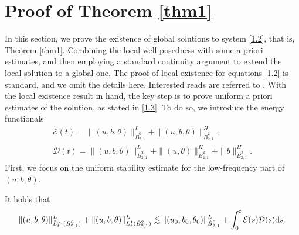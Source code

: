 \documentclass[reqno]{amsart}
\begin{document}
\section{Proof of Theorem \ref{thm1}}

 In this section, we prove the existence of global solutions to system
 \eqref{1.2}, that is, Theorem \ref{thm1}. Combining the local well-posedness with
some a priori estimates, and then employing a standard continuity argument to extend
the local solution to a global one. The proof of local existence for equations
\eqref{1.2} is standard, and we omit the details here. Interested reads are referred
to \cite{MR1855277,MR4496608}. With the local existence result in hand, the key step
is to prove uniform a priori estimates of the solution, as stated in \eqref{1.3}.
To do so, we introduce the energy functionals
 \begin{equation}\label{3.1}
\begin{gathered}
 \mathcal{E}(t)=\|(u,b,\theta)\|^L_{\dot{B}^0_{2,1}}
 +\|(u,b,\theta)\|^H_{\dot{B}^2_{2,1}}, \\
 \mathcal{D}(t)=\|(u,b,\theta)\|^L_{\dot{B}^2_{2,1}}+\|(u,\theta)\|^H_{\dot{B}^2_{2,1}}
 +\|b\|^H_{\dot{B}^3_{2,1}}.
\end{gathered}
\end{equation}
First, we focus on the uniform stability estimate for the low-frequency part of
$(u,b,\theta)$.

\begin{lemma}\label{lem3.1}
It holds that
\begin{equation}\label{3.2}
 \|(u,b,\theta)\|_{\tilde{L}^\infty_t(\dot{B}^0_{2,1})}^L+\|(u,b,\theta)\|_{{L}^1_t(\dot{B}^2_{2,1})}^L\lesssim\|(u_0,b_0,\theta_0)\|_{\dot{B}^0_{2,1}}^L+\int_0^t\mathcal{E}(s)\mathcal{D}(s){\rm d}s.
\end{equation}
\end{lemma}
\end{document}
